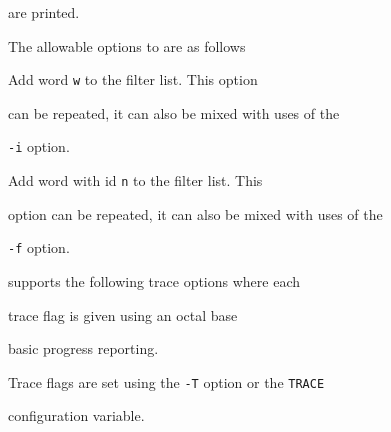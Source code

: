 are printed.





The allowable options to  are as follows





\begin{optlist}


  Add word \texttt{w} to the filter list.  This option


     can be repeated, it can also be mixed with uses of the


     \texttt{-i} option.


  Add word with id \texttt{n} to the filter list.  This


     option can be repeated, it can also be mixed with uses of the


     \texttt{-f} option.


\end{optlist}












 supports the following trace options where each


trace flag is given using an octal base


\begin{optlist}





  basic progress reporting. 


\end{optlist}


Trace flags are set using the \texttt{-T} option or the  \texttt{TRACE} 


configuration variable.

























